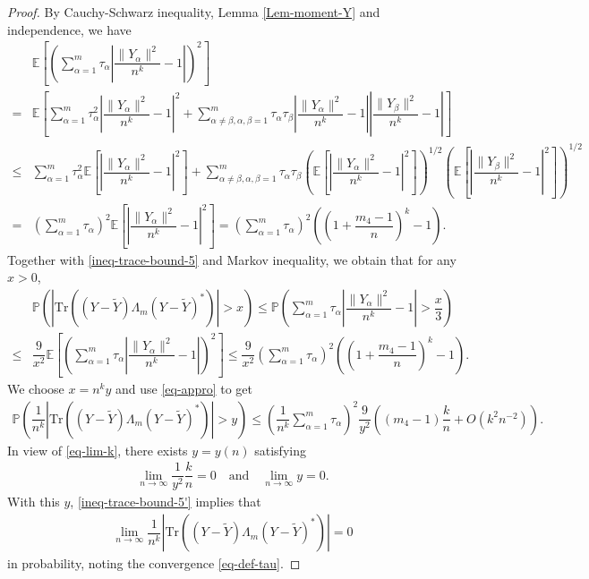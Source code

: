 \documentclass[12pt]{article}
\numberwithin{equation}{section} \theoremstyle{plain}
\def\bE{\mathbb E}
\def\bP{\mathbb P}
\def\Tr{\mathrm {Tr}}
\begin{document}
\begin{proof}
By Cauchy-Schwarz inequality, Lemma \ref{Lem-moment-Y} and independence, we have
\begin{align*}
    & \bE \left[ \left( \sum_{\alpha=1}^m \tau_\alpha \left| \dfrac{\|Y_\alpha\|^2}{n^k} - 1 \right| \right)^2 \right] \\
    =& \bE \left[ \sum_{\alpha=1}^m \tau_\alpha^2 \left| \dfrac{\|Y_\alpha\|^2}{n^k} - 1 \right|^2 + \sum_{\alpha\not=\beta,\alpha,\beta=1}^m \tau_\alpha\tau_\beta \left| \dfrac{\|Y_\alpha\|^2}{n^k} - 1 \right| \left| \dfrac{\|Y_\beta\|^2}{n^k} - 1 \right| \right] \\
    \le& \sum_{\alpha=1}^m \tau_\alpha^2 \bE \left[ \left| \dfrac{\|Y_\alpha\|^2}{n^k} - 1 \right|^2 \right] + \sum_{\alpha\not=\beta,\alpha,\beta=1}^m \tau_\alpha\tau_\beta \left( \bE \left[ \left| \dfrac{\|Y_\alpha\|^2}{n^k} - 1 \right|^2 \right] \right)^{1/2} \left( \bE \left[ \left| \dfrac{\|Y_\beta\|^2}{n^k} - 1 \right|^2 \right] \right)^{1/2} \\
    =& \left( \sum_{\alpha=1}^m \tau_\alpha \right)^2 \bE \left[ \left| \dfrac{\|Y_\alpha\|^2}{n^k} - 1 \right|^2 \right]
    = \left( \sum_{\alpha=1}^m \tau_\alpha \right)^2 \left( \left( 1 + \dfrac{m_4-1}{n} \right)^k - 1 \right).
\end{align*}
Together with \eqref{ineq-trace-bound-5} and Markov inequality, we obtain that for any $x>0$,
\begin{align*}
    & \bP \left( \left| \Tr \left( \left( Y - \widetilde Y \right) \Lambda_m \left( Y - \widetilde Y \right)^* \right) \right| > x \right)
    \le \bP \left( \sum_{\alpha=1}^m \tau_\alpha \left| \dfrac{\|Y_\alpha\|^2}{n^k} - 1 \right| > \dfrac{x}{3} \right) \\
    \le& \dfrac{9}{x^2} \bE \left[ \left( \sum_{\alpha=1}^m \tau_\alpha \left| \dfrac{\|Y_\alpha\|^2}{n^k} - 1 \right| \right)^2 \right]
    \le \dfrac{9}{x^2} \left( \sum_{\alpha=1}^m \tau_\alpha \right)^2 \left( \left( 1 + \dfrac{m_4-1}{n} \right)^k - 1 \right).
\end{align*}
We choose $x = n^k y$ and use \eqref{eq-appro} to get
\begin{align} \label{ineq-trace-bound-5'}
    \bP \left( \dfrac{1}{n^k} \left| \Tr \left( \left( Y - \widetilde Y \right) \Lambda_m \left( Y - \widetilde Y \right)^* \right) \right| > y \right)
    \le \left( \dfrac{1}{n^k} \sum_{\alpha=1}^m \tau_\alpha \right)^2 \dfrac{9}{y^2} \left( (m_4-1) \dfrac{k}{n} + O(k^2n^{-2}) \right).
\end{align}
In view of \eqref{eq-lim-k}, there exists $y = y(n)$ satisfying
\begin{align*}
    \lim_{n \to \infty} \dfrac{1}{y^2} \dfrac{k}{n} = 0
    \quad \mathrm{and} \quad
    \lim_{n \to \infty} y = 0.
\end{align*}
With this $y$, \eqref{ineq-trace-bound-5'} implies that
\begin{align} \label{ineq-trace-bound-6}
    \lim_{n \to \infty} \dfrac{1}{n^k} \left| \Tr \left( \left( Y - \widetilde Y \right) \Lambda_m \left( Y - \widetilde Y \right)^* \right) \right| = 0
\end{align}
in probability, noting the convergence \eqref{eq-def-tau}.


\end{proof}
\end{document}

